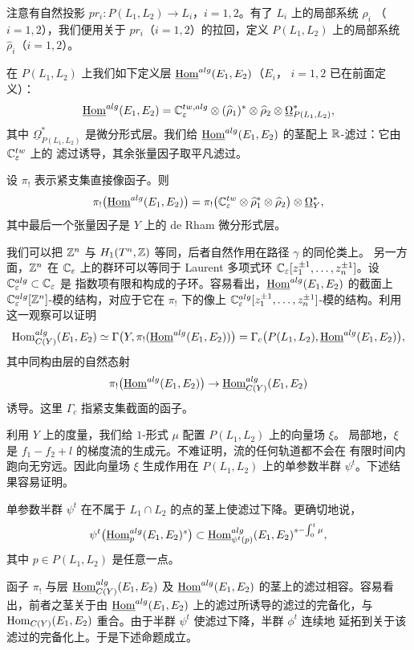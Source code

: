 注意有自然投影 $pr_i:P(L_1,L_2)\to L_i$，$i=1,2$。有了 $L_i$ 上的局部系统 $\rho_i$
（$i=1,2$），我们便用关于 $pr_i$（$i=1,2$）的拉回，定义 $P(L_1,L_2)$ 上的局部系统
$\widehat{\rho}_i$（$i=1,2$）。

在 $P(L_1,L_2)$ 上我们如下定义层 $\underline{\operatorname{Hom}}^{alg}(E_1,E_2)$（$E_i$，
$i=1,2$ 已在前面定义）：
\[
  \underline{\operatorname{Hom}}^{alg}(E_1,E_2)
  =\mathbb{C}^{tw,alg}_{\varepsilon}\otimes(\widehat{\rho}_1)^{*}\otimes\widehat{\rho}_2
  \otimes\underline{\Omega}^{*}_{P(L_1,L_2)},
\]
其中 $\underline{\Omega}^{*}_{P(L_1,L_2)}$ 是微分形式层。我们给
$\underline{\operatorname{Hom}}^{alg}(E_1,E_2)$ 的茎配上 $\mathbb{R}$-滤过：它由 $\mathbb{C}^{tw}_{\varepsilon}$ 上的
滤过诱导，其余张量因子取平凡滤过。

设 $\pi_!$ 表示紧支集直接像函子。则
\[
  \pi_!\bigl(\underline{\operatorname{Hom}}^{alg}(E_1,E_2)\bigr)
  =\pi_!\bigl(\mathbb{C}^{tw}_{\varepsilon}\otimes\widehat{\rho}^{*}_1\otimes\widehat{\rho}_2
  \bigr)\otimes\underline{\Omega}^{*}_Y,
\]
其中最后一个张量因子是 $Y$ 上的 de Rham 微分形式层。

我们可以把 $\mathbb{Z}^n$ 与 $H_1(T^n,\mathbb{Z})$ 等同，后者自然作用在路径 $\gamma$ 的同伦类上。
另一方面，$\mathbb{Z}^n$ 在 $\mathbb{C}_{\varepsilon}$ 上的群环可以等同于 Laurent 多项式环
$\mathbb{C}_{\varepsilon}[z_1^{\pm1},\dots,z_n^{\pm1}]$。设 $\mathbb{C}^{alg}_{\varepsilon}\subset\mathbb{C}_{\varepsilon}$ 是
指数项有限和构成的子环。容易看出，$\underline{\operatorname{Hom}}^{alg}(E_1,E_2)$ 的截面上
$\mathbb{C}^{alg}_{\varepsilon}[\mathbb{Z}^n]$-模的结构，对应于它在 $\pi_!$ 下的像上
$\mathbb{C}^{alg}_{\varepsilon}[z_1^{\pm1},\dots,z_n^{\pm1}]$-模的结构。利用这一观察可以证明
\[
  \operatorname{Hom}^{alg}_{C(Y)}(E_1,E_2)\simeq
  \Gamma\bigl(Y,\pi_!(\underline{\operatorname{Hom}}^{alg}(E_1,E_2))\bigr)
  =\Gamma_c\bigl(P(L_1,L_2),\underline{\operatorname{Hom}}^{alg}(E_1,E_2)\bigr),
\]
其中同构由层的自然态射
\[
  \pi_!\bigl(\underline{\operatorname{Hom}}^{alg}(E_1,E_2)\bigr)
  \to\underline{\operatorname{Hom}}^{alg}_{C(Y)}(E_1,E_2)
\]
诱导。这里 $\Gamma_c$ 指紧支集截面的函子。

利用 $Y$ 上的度量，我们给 $1$-形式 $\mu$ 配置 $P(L_1,L_2)$ 上的向量场 $\xi$。
局部地，$\xi$ 是 $f_1-f_2+l$ 的梯度流的生成元。不难证明，流的任何轨道都不会在
有限时间内跑向无穷远。因此向量场 $\xi$ 生成作用在 $P(L_1,L_2)$ 上的单参数半群
$\psi^t$。下述结果容易证明。

\begin{prp}
单参数半群 $\psi^t$ 在不属于 $L_1\cap L_2$ 的点的茎上使滤过下降。更确切地说，
\[
  \psi^t\bigl(\underline{\operatorname{Hom}}^{alg}_p(E_1,E_2)^s\bigr)
  \subset\underline{\operatorname{Hom}}^{alg}_{\psi^t(p)}(E_1,E_2)^{s-\int_0^t\mu},
\]
其中 $p\in P(L_1,L_2)$ 是任意一点。
\end{prp}

函子 $\pi_!$ 与层 $\underline{\operatorname{Hom}}^{alg}_{C(Y)}(E_1,E_2)$ 及
$\underline{\operatorname{Hom}}^{alg}(E_1,E_2)$ 的茎上的滤过相容。容易看出，前者之茎关于由
$\underline{\operatorname{Hom}}^{alg}(E_1,E_2)$ 上的滤过所诱导的滤过的完备化，与
$\operatorname{Hom}_{C(Y)}(E_1,E_2)$ 重合。由于半群 $\psi^t$ 使滤过下降，半群 $\phi^t$ 连续地
延拓到关于该滤过的完备化上。于是下述命题成立。

